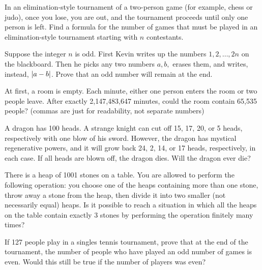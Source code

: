 \documentclass[12pt]{article}
\begin{document}
        \begin{exercise}
            In an elimination-style tournament of a two-person game (for example, chess or judo), once you lose, you are out, and the tournament proceeds until only one person is left. Find a formula for the number of games that must be played in an elimination-style tournament starting with \(n\) contestants.
        \end{exercise}
    
        \begin{exercise}
            Suppose the integer \(n\) is odd. First Kevin writes up the numbers \(1, 2, \ldots, 2n\) on the blackboard. Then he picks any two numbers \(a, b,\) erases them, and writes, instead, \(\left\lvert a-b \right\rvert\). Prove that an odd number will remain at the end.
        \end{exercise}
    
        \begin{exercise}
            At first, a room is empty. Each minute, either one person enters the room or two people leave. After exactly 2,147,483,647 minutes, could the room contain 65,535 people? (commas are just for readability, not separate numbers)
        \end{exercise}
    
        \begin{exercise}
            A dragon has 100 heads. A strange knight can cut off 15, 17, 20, or 5 heads, respectively with one blow of his sword. However, the dragon has mystical regenerative powers, and it will grow back 24, 2, 14, or 17 heads, respectively, in each case. If all heads are blown off, the dragon dies. Will the dragon ever die?
        \end{exercise}
    
        \begin{exercise}
            There is a heap of 1001 stones on a table. You are allowed to perform the following operation: you choose one of the heaps containing more than one stone, throw away a stone from the heap, then divide it into two smaller (not necessarily equal) heaps. Is it possible to reach a situation in which all the heaps on the table contain exactly 3 stones by performing the operation finitely many times?
        \end{exercise}

        \begin{exercise}
            If 127 people play in a singles tennis tournament, prove that at the end of the tournament, the number of people who have played an odd number of games is even. Would this still be true if the number of players was even?
        \end{exercise}
    
\end{document}
